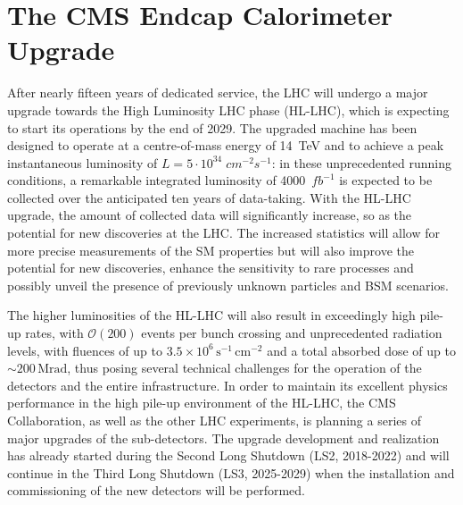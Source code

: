 



\chapter{The CMS Endcap Calorimeter Upgrade}

After nearly fifteen years of dedicated service, the LHC will undergo a major upgrade towards the High Luminosity LHC phase (HL-LHC), which is expecting to start its operations by the end of 2029.
The upgraded machine has been designed to operate at a  centre-of-mass energy of 14~TeV and to achieve a peak instantaneous luminosity of $L=5\cdot10^{34}\;cm^{-2}s^{-1}$: in these unprecedented running conditions, a remarkable integrated luminosity of 4000~$fb^{-1}$ is expected to be collected over the anticipated ten years of data-taking. 
With the HL-LHC upgrade, the amount of collected data will significantly increase, so as the potential for new discoveries at the LHC. The increased statistics will allow for more precise measurements of the SM properties but will also improve the potential for new discoveries, enhance the sensitivity to rare processes and possibly unveil the presence of previously unknown particles and BSM scenarios.

The higher luminosities of the HL-LHC will also result in exceedingly high pile-up rates, with $\mathcal{O}(200)$ events per bunch crossing and unprecedented radiation levels, with fluences of up to $3.5\times10^6\,\textrm{s}^{-1}\,\textrm{cm}^{-2}$ and a total absorbed dose of up to $\sim$$200\,\textrm{Mrad}$, thus posing several technical challenges for the operation of the detectors and the entire infrastructure.
In order to maintain its excellent physics performance in the high pile-up environment of the HL-LHC, the CMS Collaboration, as well as the other LHC experiments, is planning a series of major upgrades of the sub-detectors. The upgrade development and realization has already started during the Second Long Shutdown (LS2, 2018-2022) and will continue in the Third Long Shutdown (LS3, 2025-2029) when the installation and commissioning of the new detectors will be performed. 

